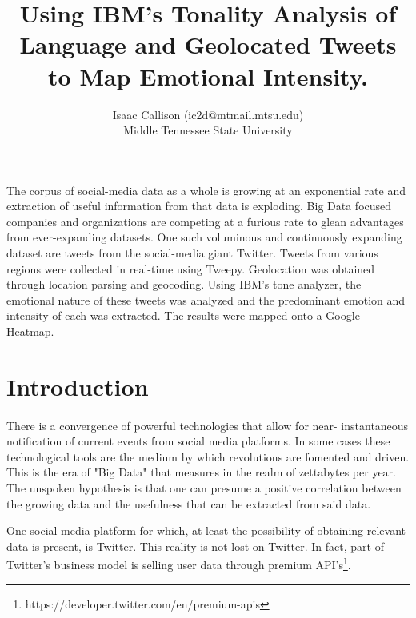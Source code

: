 \documentclass[12pt, oneside]{article}
\title{Using IBM's Tonality Analysis of Language and Geolocated Tweets to Map Emotional Intensity.
\\\medskip}
\author{Isaac Callison (ic2d@mtmail.mtsu.edu)\\Middle Tennessee State University}
\begin{document}
\maketitle
\nocite{*}
\newpage{}


\renewenvironment{abstract}
 {\small
  \begin{center}
  \bfseries \abstractname\vspace{-.5em}\vspace{0pt}
  \end{center}
  \list{}{
    \setlength{\leftmargin}{.8cm}%
    \setlength{\rightmargin}{\leftmargin}%
  }%
  \item\relax}
 {\endlist}

\begin{abstract}
The corpus of social-media data as a whole is growing at an exponential rate
and extraction of useful information from that data is exploding.
Big Data focused companies and organizations are competing at a furious rate to
glean advantages from ever-expanding datasets. One such voluminous and
continuously expanding dataset are tweets from the social-media giant Twitter.
Tweets from various regions were collected in real-time using Tweepy.
Geolocation was obtained through location parsing and geocoding. Using IBM's
tone analyzer, the emotional nature of these tweets was analyzed and the
predominant emotion and intensity of each was extracted. The results were
mapped onto a Google Heatmap.
\end{abstract}

\section{Introduction}
\paragraph{}
There is a convergence of powerful technologies that allow for near-
instantaneous notification of current events from
social media platforms. In some cases these technological tools are the medium
by which revolutions are fomented and driven\cite{arab}. This is the era of "Big
Data" that measures in the realm of zettabytes per year. The unspoken
hypothesis is that one can presume a positive correlation between the growing
data and the usefulness that can be extracted from said data\cite{villars2011}.

One social-media platform for which, at least the possibility of obtaining
relevant data is present, is Twitter. This reality is not lost
on Twitter. In fact, part of Twitter's business model is selling user data
through premium API's\footnote{https://developer.twitter.com/en/premium-apis}.
\end{document}
